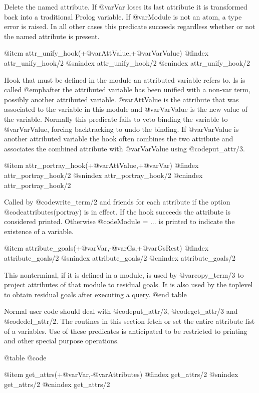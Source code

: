 {{{{{{{{Delete the named attribute.  If @var{Var} loses its last attribute it
is transformed back into a traditional Prolog variable.  If @var{Module}
is not an atom, a type error is raised. In all other cases this
predicate succeeds regardless whether or not the named attribute is
present.

@item attr_unify_hook(+@var{AttValue},+@var{VarValue})
@findex attr_unify_hook/2
@snindex attr_unify_hook/2
@cnindex attr_unify_hook/2

Hook that must be defined in the module an attributed variable refers
to. Is is called @emph{after} the attributed variable has been
unified with a non-var term, possibly another attributed variable.
@var{AttValue} is the attribute that was associated to the variable
in this module and @var{VarValue} is the new value of the variable.
Normally this predicate fails to veto binding the variable to
@var{VarValue}, forcing backtracking to undo the binding.  If
@var{VarValue} is another attributed variable the hook often combines
the two attribute and associates the combined attribute with
@var{VarValue} using @code{put_attr/3}.

@item attr_portray_hook(+@var{AttValue},+@var{Var})
@findex attr_portray_hook/2
@snindex attr_portray_hook/2
@cnindex attr_portray_hook/2

Called by @code{write_term/2} and friends for each attribute if the option
@code{attributes(portray)} is in effect.  If the hook succeeds the
attribute is considered printed.  Otherwise  @code{Module = ...} is
printed to indicate the existence of a variable.

@item attribute_goals(+@var{Var},-@var{Gs},+@var{GsRest})
@findex attribute_goals/2
@snindex attribute_goals/2
@cnindex attribute_goals/2

This nonterminal, if it is defined in a module, is used by @var{copy_term/3}
to project attributes of that module to residual goals. It is also
used by the toplevel to obtain residual goals after executing a query.
@end table

Normal user code should deal with @code{put_attr/3}, @code{get_attr/3} and @code{del_attr/2}.
The routines in this section fetch or set the entire attribute list of a
variables. Use of these predicates is anticipated to be restricted to
printing and other special purpose operations.

@table @code

@item get_attrs(+@var{Var},-@var{Attributes})
@findex get_attrs/2
@snindex get_attrs/2
@cnindex get_attrs/2

}}}}}}}}
